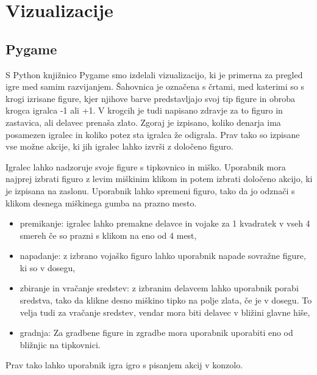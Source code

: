 \documentclass[a4paper, 12pt]{book}
\begin{document}
\chapter{Vizualizacije}
\label{chvizualizacija}

\section{Pygame}
S Python knjižnico Pygame smo izdelali vizualizacijo, ki je primerna za pregled igre med samim razvijanjem. 
Šahovnica je označena s črtami, med katerimi so s krogi izrisane figure, kjer njihove barve predstavljajo svoj tip figure in obroba krogca igralca -1 ali +1.
V krogcih je tudi napisano zdravje za to figuro in zastavica, ali delavec prenaša zlato.
Zgoraj je izpisano, koliko denarja ima posamezen igralec in koliko potez sta igralca že odigrala. 
Prav tako so izpisane vse možne akcije, ki jih igralec lahko izvrši z določeno figuro.

Igralec lahko nadzoruje svoje figure s tipkovnico in miško.
Uporabnik mora najprej izbrati figuro z levim miškinim klikom in potem izbrati določeno akcijo, ki je izpisana na zaslonu. 
Uporabnik lahko spremeni figuro, tako da jo odznači s klikom desnega miškinega gumba na prazno mesto.

\begin{itemize}
	\item premikanje: igralec lahko premakne delavce in vojake za 1 kvadratek v vseh 4 smereh če so prazni s klikom na eno od 4 mest,
	\item napadanje: z izbrano vojaško figuro lahko uporabnik napade sovražne figure, ki so v dosegu,
	\item zbiranje in vračanje sredstev: z izbranim delavcem lahko uporabnik porabi sredstva, tako da klikne desno miškino tipko na polje zlata, če je v dosegu. 
	To velja tudi za vračanje sredstev, vendar mora biti delavec v bližini glavne hiše,
	\item gradnja: Za gradbene figure in zgradbe mora uporabnik uporabiti eno od bližnjic na tipkovnici.
\end{itemize}

Prav tako lahko uporabnik igra igro s pisanjem akcij v konzolo.
\end{document}
